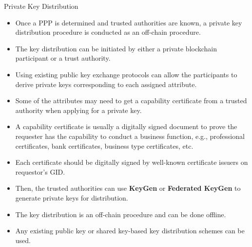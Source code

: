\documentclass[11pt]{beamer}
\begin{document}
\begin{frame}[allowframebreaks]{Private Key Distribution}

\begin{itemize}

\item Once a PPP is determined and trusted authorities are known, a private key distribution procedure is conducted as an off-chain procedure.
\item The key distribution can be initiated by either a private blockchain participant or a trust authority.
\item  Using existing public key exchange protocols can allow the participants to derive private keys corresponding to each assigned attribute.
\item Some of the attributes may need to get a capability certificate from a trusted authority when applying for a private key.
\item A capability certificate is usually a digitally signed document to prove the requester has the capability to conduct a business function, e.g., professional certificates, bank certificates, business type certificates, etc.
\item  Each certificate should be digitally signed by well-known certificate issuers on requestor’s GID.
\item Then, the trusted authorities can use \textbf{KeyGen} or \textbf{Federated KeyGen} to generate private keys for distribution.
\item The key distribution is an off-chain procedure and can be done offline.
\item Any existing public key or shared key-based key distribution schemes can be used.

\end{itemize}

\end{frame}
\end{document}
